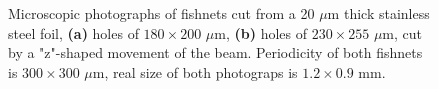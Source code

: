 
\begin{figure}[ht] \caption{Microscopic photographs of fishnets cut from a 20 $\mu$m thick stainless steel foil, \textbf{(a)} holes of $180\times 200$ $\mu$m,  \textbf{(b)} holes of $230\times 255$ $\mu$m, cut by a "z"-shaped movement of the beam. Periodicity of both fishnets is $300\times 300$ $\mu$m, real size of both photograps is $1.2\times 0.9$ mm.  } \label{fg_mesh} \centering 
\end{figure}



